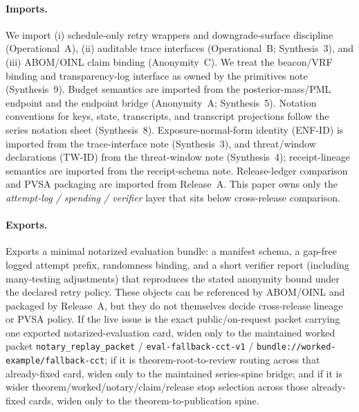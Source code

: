 \documentclass[11pt]{article}
\begin{document}
\paragraph{Imports.}
We import (i) schedule-only retry wrappers and downgrade-surface discipline (Operational~A), (ii) auditable trace interfaces (Operational~B; Synthesis~3), and (iii) ABOM/OINL claim binding (Anonymity~C). We treat the beacon/VRF binding and transparency-log interface as owned by the primitives note (Synthesis~9).\cite{series:transparencyprimitives}
Budget semantics are imported from the posterior-mass/PML endpoint and the endpoint bridge (Anonymity~A; Synthesis~5).\cite{series:oddsinflation,series:endpointbridge,series:abomoinl}
Notation conventions for keys, state, transcripts, and transcript projections follow the series notation sheet (Synthesis~8). Exposure-normal-form identity (ENF-ID) is imported from the trace-interface note (Synthesis~3), and threat/window declarations (TW-ID) from the threat-window note (Synthesis~4); receipt-lineage semantics are imported from the receipt-schema note. Release-ledger comparison and PVSA packaging are imported from Release~A.\cite{series:notation,series:traceifaces,series:threatwindows,series:receiptitems,series:releaseproperty}
This paper owns only the \emph{attempt-log / spending / verifier} layer that sits below cross-release comparison.

\paragraph{Exports.}
Exports a minimal notarized evaluation bundle: a manifest schema, a gap-free logged attempt prefix, randomness binding, and a short verifier report (including many-testing adjustments) that reproduces the stated anonymity bound under the declared retry policy.
These objects can be referenced by ABOM/OINL and packaged by Release~A, but they do not themselves decide cross-release lineage or PVSA policy. If the live issue is the exact public/on-request packet carrying one exported notarized-evaluation card, widen only to the maintained worked packet \nolinkurl{notary\_replay\_packet} / \nolinkurl{eval-fallback-cct-v1} / \nolinkurl{bundle://worked-example/fallback-cct}; if it is theorem-root-to-review routing across that already-fixed card, widen only to the maintained series-spine bridge; and if it is wider theorem/worked/notary/claim/release stop selection across those already-fixed cards, widen only to the theorem-to-publication spine.\cite{series:abomoinl,series:releaseproperty,series:workedexample,series:seriesspines,series:theoremtopublicationspine}
\end{document}
